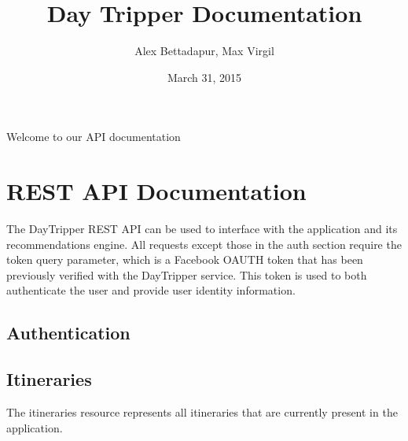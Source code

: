 \documentclass[letterpaper,10pt,english]{sphinxmanual}
\title{Day Tripper Documentation}
\date{March 31, 2015}
\author{Alex Bettadapur, Max Virgil}
\begin{document}
\maketitle
\tableofcontents
{}\label{index::doc}


Welcome to our API documentation


\chapter{REST API Documentation}
\label{apidoc:welcome-to-day-tripper-s-documentation}\label{apidoc:rest-api-documentation}\label{apidoc::doc}
The DayTripper REST API can be used to interface with the application and its recommendations engine. All requests except those in the auth section require the token query parameter, which is a Facebook OAUTH token that has been previously verified with the DayTripper service. This token is used to both authenticate the user and provide user identity information.


\section{Authentication}
\label{apidoc:authentication}

\section{Itineraries}
\label{apidoc:itineraries}
The itineraries resource represents all itineraries that are currently present in the application.
\end{document}
